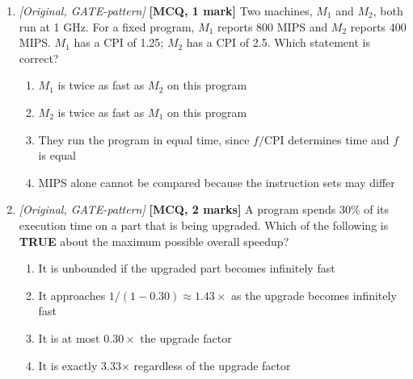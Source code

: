 \documentclass[11pt]{article}
\begin{document}
\begin{enumerate}
\item[\textbf{Q5}] \textit{[Original, GATE-pattern]} \textbf{[MCQ, 1 mark]} Two machines, $M_1$ and $M_2$, both run at 1 GHz. For a fixed program, $M_1$ reports 800 MIPS and $M_2$ reports 400 MIPS. $M_1$ has a CPI of 1.25; $M_2$ has a CPI of 2.5. Which statement is correct?
\begin{enumerate}
  \item[(A)] $M_1$ is twice as fast as $M_2$ on this program
  \item[(B)] $M_2$ is twice as fast as $M_1$ on this program
  \item[(C)] They run the program in equal time, since $f/\text{CPI}$ determines time and $f$ is equal
  \item[(D)] MIPS alone cannot be compared because the instruction sets may differ
\end{enumerate}

\item[\textbf{Q6}] \textit{[Original, GATE-pattern]} \textbf{[MCQ, 2 marks]} A program spends 30\% of its execution time on a part that is being upgraded. Which of the following is \textbf{TRUE} about the maximum possible overall speedup?
\begin{enumerate}
  \item[(A)] It is unbounded if the upgraded part becomes infinitely fast
  \item[(B)] It approaches $1/(1 - 0.30) \approx 1.43\times$ as the upgrade becomes infinitely fast
  \item[(C)] It is at most $0.30 \times$ the upgrade factor
  \item[(D)] It is exactly 3.33$\times$ regardless of the upgrade factor
\end{enumerate}

\end{enumerate}
\end{document}
